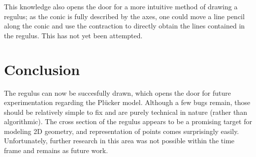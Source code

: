 \documentclass[a4paper, 10pt]{article}
\begin{document}
This knowledge also opens the door for a more intuitive method of drawing a
regulus; as the conic is fully described by the axes, one could move a line
pencil along the conic and use the contraction to directly obtain the lines
contained in the regulus. This has not yet been attempted.

\section{Conclusion}
The regulus can now be succesfully drawn, which opens the door for future
experimentation regarding the Pl\"{u}cker model. Although a few bugs remain,
those should be relatively simple to fix and are purely technical in nature
(rather than algorithmic). The cross section of the regulus appears to be a
promising target for modeling 2D geometry, and representation of points comes
surprisingly easily. Unfortunately, further research in this area was not
possible within the time frame and remains as future work.




\end{document}
